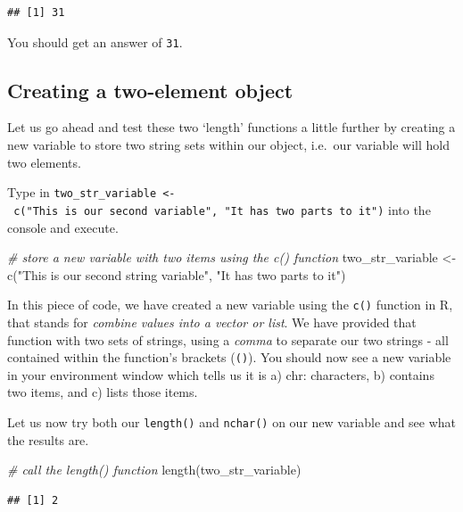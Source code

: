 \documentclass[
]{book}
\newenvironment{Shaded}{\begin{snugshade}}{\end{snugshade}}
\newcommand{\CommentTok}[1]{\textcolor[rgb]{0.56,0.35,0.01}{\textit{#1}}}
\newcommand{\FunctionTok}[1]{\textcolor[rgb]{0.00,0.00,0.00}{#1}}
\newcommand{\NormalTok}[1]{#1}
\newcommand{\OtherTok}[1]{\textcolor[rgb]{0.56,0.35,0.01}{#1}}
\newcommand{\StringTok}[1]{\textcolor[rgb]{0.31,0.60,0.02}{#1}}
\begin{document}
\begin{verbatim}
## [1] 31
\end{verbatim}

You should get an answer of \texttt{31}.

\hypertarget{creating-a-two-element-object}{%
\subsection{Creating a two-element object}\label{creating-a-two-element-object}}

Let us go ahead and test these two `length' functions a little further by creating a new variable to store two string sets within our object, i.e.~our variable will hold two elements.

Type in \texttt{two\_str\_variable\ \textless{}-\ c("This\ is\ our\ second\ variable",\ "It\ has\ two\ parts\ to\ it")} into the console and execute.

\begin{Shaded}
\begin{Highlighting}[]
\CommentTok{\# store a new variable with two items using the c() function}
\NormalTok{two\_str\_variable }\OtherTok{\textless{}{-}} \FunctionTok{c}\NormalTok{(}\StringTok{"This is our second string variable"}\NormalTok{, }\StringTok{"It has two parts to it"}\NormalTok{)}
\end{Highlighting}
\end{Shaded}

In this piece of code, we have created a new variable using the \texttt{c()} function in R, that stands for \emph{combine values into a vector or list}. We have provided that function with two sets of strings, using a \emph{comma} to separate our two strings - all contained within the function's brackets (\texttt{()}). You should now see a new variable in your environment window which tells us it is a) chr: characters, b) contains two items, and c) lists those items.

Let us now try both our \texttt{length()} and \texttt{nchar()} on our new variable and see what the results are.

\begin{Shaded}
\begin{Highlighting}[]
\CommentTok{\# call the length() function }
\FunctionTok{length}\NormalTok{(two\_str\_variable)}
\end{Highlighting}
\end{Shaded}

\begin{verbatim}
## [1] 2
\end{verbatim}
\end{document}
